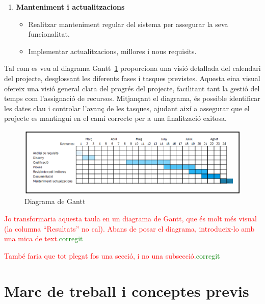 \documentclass[a4paper,12pt,twoside]{ThesisStyle}
\newcommand{\pau}[1]{\textcolor{red}{#1}}
\newcommand{\sudan}[1]{\textcolor{green}{#1}}
\begin{document}
\begin{enumerate}
  \item \textbf{Manteniment i actualitzacions}
    \begin{itemize}
        \item Realitzar manteniment regular del sistema per assegurar la seva funcionalitat.
        \item Implementar actualitzacions, millores i nous requisits.
    \end{itemize}
\end{enumerate}



Tal com es veu al diagrama Gantt~\ref{fig:Diagrama de Gantt} proporciona una visió detallada del calendari del projecte, desglossant les diferents fases i tasques previstes. Aquesta eina visual ofereix una visió general clara del progrés del projecte, facilitant tant la gestió del temps com l'assignació de recursos. Mitjançant el diagrama, és possible identificar les dates clau i controlar l’avanç de les tasques, ajudant així a assegurar que el projecte es mantingui en el camí correcte per a una finalització exitosa.

\begin{figure}[h!] %
    \centering
    \includegraphics[width=1\textwidth]{imatges/gantt.png} %
    \caption{Diagrama de Gantt} %
    \label{fig:Diagrama de Gantt} %
  \end{figure}

\pau{Jo transformaria aquesta taula en un diagrama de Gantt, que és molt més visual (la columna ``Resultats'' no cal). Abans de posar el diagrama, introdueix-lo amb una mica de text.}\sudan{corregit}

\pau{També faria que tot plegat fos una secció, i no una subsecció.}\sudan{corregit}



\chapter{Marc de treball i conceptes previs}
\label{chp:marcdetreball}
\end{document}
